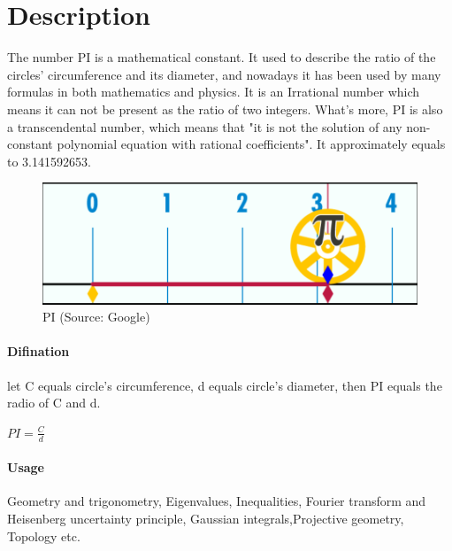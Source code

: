 \documentclass[12pt,letterpaper]{article}
\begin{document}
	
	\section{Description}
	
	The number PI is a mathematical constant. It used to describe the ratio of the circles' circumference and its diameter, and nowadays it has been used by many formulas in both mathematics and physics. It is an Irrational number which means it can not be present as the ratio of two integers. What's more, PI is also a transcendental number, which means that "it is not the solution of any non-constant polynomial equation with rational coefficients".\citep{wiki:pi} It approximately equals to 3.141592653.
	
	
	\begin{figure}[h!]
		\centering
		\includegraphics[scale=0.4]{PI.png}
		\caption{PI (Source: Google)}
		\label{fig:universe}
	\end{figure}
	
	\paragraph{Difination}
	let C equals circle's circumference, d equals circle's diameter, then PI equals the radio of C and d.
	
	
	\begin{center}
		$PI=\frac{C}{d}$
	\end{center}
	
	\paragraph{Usage} 
	Geometry and trigonometry, Eigenvalues, Inequalities, Fourier transform and Heisenberg uncertainty principle, Gaussian integrals,Projective geometry, Topology etc.
	
	
	
	
	
\end{document}
